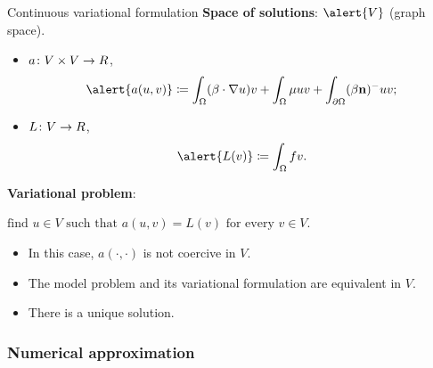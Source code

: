 	\begin{frame}{Continuous variational formulation}
	\textbf{Space of solutions}: $\alert{V}$ (graph space).
	\begin{itemize}\itemsep1em
		\item $a\colon V\times V\to \relax R$, $$\alert{a(u,v)}\coloneqq\int_\Omega(\beta\cdot\nabla u)v+\int_\Omega\mu u v+\int_{\partial\Omega}(\beta\mathbf{n})^-uv;$$
		\item $L\colon V\to\relax R$, $$\alert{L(v)}\coloneqq\int_\Omega f v.$$
	\end{itemize}
	\textbf{Variational problem}:
	\begin{block}{}
		\begin{center}
			$\text{find }u\in V\text{ such that }a(u,v)=L(v)\text{ for every } v\in V.$
		\end{center}
	\end{block}
	
	\begin{itemize}%
		\item In this case, $a(\cdot,\cdot)$ is \alert{not coercive in $V$}.
		\item The model problem and its variational formulation are \alert{equivalent} in $V$.
		\item There is a unique solution.
	\end{itemize}
	
	\end{frame}

\subsubsection{Numerical approximation}

